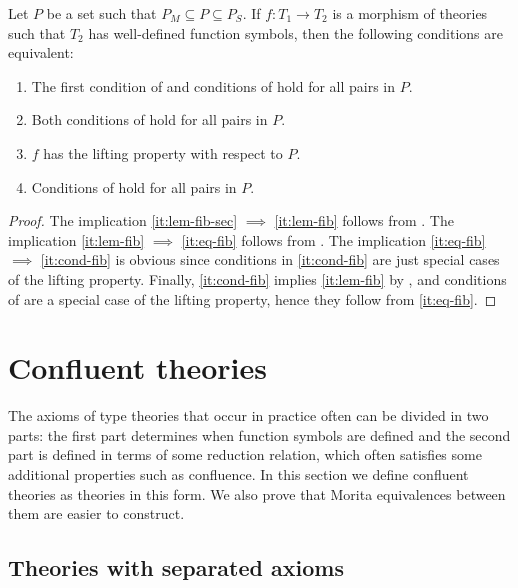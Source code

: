 \documentclass[reqno]{amsart}
\theoremstyle{definition}
\theoremstyle{remark}
\numberwithin{figure}{section}
\begin{document}
\begin{prop}
Let $P$ be a set such that $P_M \subseteq P \subseteq P_S$.
If $f : T_1 \to T_2$ is a morphism of theories such that $T_2$ has well-defined function symbols, then the following conditions are equivalent:
\begin{enumerate}
\item \label{it:lem-fib-sec} The first condition of  and conditions of  hold for all pairs in $P$.
\item \label{it:lem-fib} Both conditions of  hold for all pairs in $P$.
\item \label{it:eq-fib} $f$ has the lifting property with respect to $P$.
\item \label{it:cond-fib} Conditions of  hold for all pairs in $P$.
\end{enumerate}
\end{prop}
\begin{proof}
The implication \eqref{it:lem-fib-sec} $\implies$ \eqref{it:lem-fib} follows from .
The implication \eqref{it:lem-fib} $\implies$ \eqref{it:eq-fib} follows from .
The implication \eqref{it:eq-fib} $\implies$ \eqref{it:cond-fib} is obvious since conditions in \eqref{it:cond-fib} are just special cases of the lifting property.
Finally, \eqref{it:cond-fib} implies \eqref{it:lem-fib} by , and conditions of  are a special case of the lifting property, hence they follow from \eqref{it:eq-fib}.
\end{proof}

\section{Confluent theories}
\label{sec:confluent}

The axioms of type theories that occur in practice often can be divided in two parts: the first part determines when function symbols are defined and the second part is defined in terms of some reduction relation,
which often satisfies some additional properties such as confluence.
In this section we define confluent theories as theories in this form.
We also prove that Morita equivalences between them are easier to construct.

\subsection{Theories with separated axioms}
\end{document}
